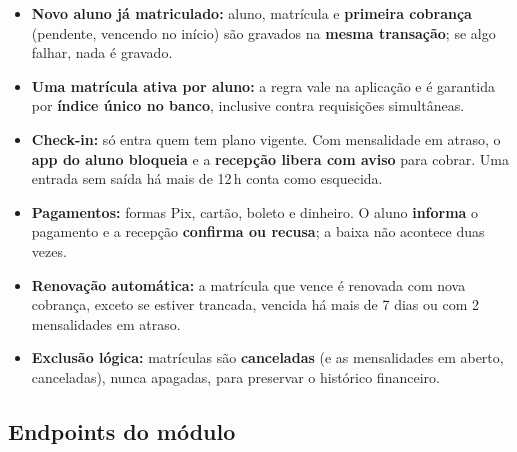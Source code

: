 \documentclass[11pt,a4paper,final]{article}
\begin{document}
\begin{itemize}
  \item \textbf{Novo aluno já matriculado:} aluno, matrícula e \textbf{primeira cobrança} (pendente, vencendo
        no início) são gravados na \textbf{mesma transação}; se algo falhar, nada é gravado.
  \item \textbf{Uma matrícula ativa por aluno:} a regra vale na aplicação e é garantida por \textbf{índice
        único no banco}, inclusive contra requisições simultâneas.
  \item \textbf{Check-in:} só entra quem tem plano vigente. Com mensalidade em atraso, o \textbf{app do aluno
        bloqueia} e a \textbf{recepção libera com aviso} para cobrar. Uma entrada sem saída há mais de 12\,h
        conta como esquecida.
  \item \textbf{Pagamentos:} formas Pix, cartão, boleto e dinheiro. O aluno \textbf{informa} o pagamento e a
        recepção \textbf{confirma ou recusa}; a baixa não acontece duas vezes.
  \item \textbf{Renovação automática:} a matrícula que vence é renovada com nova cobrança, exceto se estiver
        trancada, vencida há mais de 7 dias ou com 2 mensalidades em atraso.
  \item \textbf{Exclusão lógica:} matrículas são \textbf{canceladas} (e as mensalidades em aberto, canceladas),
        nunca apagadas, para preservar o histórico financeiro.
\end{itemize}

\subsection{Endpoints do módulo}
\end{document}
